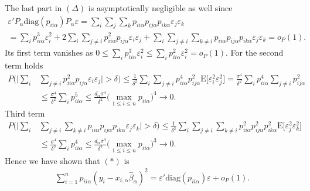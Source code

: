 \documentclass[Research_Module_ES.tex]{subfiles}
\begin{document}
The last part in $(\Delta)$ is asymptotically negligible as well since
\begin{align*}
\varepsilon'P_\alpha\mathrm{diag}(p_{ii\alpha})P_\alpha \varepsilon = \sum_i\sum_j\sum_k p_{ii\alpha}p_{ij\alpha}p_{ik\alpha}\varepsilon_j\varepsilon_k\\
=\sum_i p_{ii\alpha}^3 \varepsilon_i^2 +2\sum_i\sum_{j\neq i}p_{ii\alpha}^2p_{ij\alpha}\varepsilon_i\varepsilon_j + 
\sum_i\sum_{j\neq i}\sum_{k\neq i}p_{ii\alpha}p_{ij\alpha}p_{ik\alpha}\varepsilon_j\varepsilon_k=o_P(1).
\end{align*}
Its first term vanishes as $0\le \sum_i p_{ii\alpha}^3 \varepsilon_i^2 \le \sum_i p_{ii\alpha}^2 \varepsilon_i^2 = o_P(1)$.
For the second term holds
\begin{align*}
P\biggl(\biggl|\sum_{i}&\sum_{j\neq i}p_{ii\alpha}^2p_{ij\alpha}\varepsilon_i\varepsilon_j\biggr|>\delta\biggr)\le\frac{1}{\delta^2}\sum_{i}\sum_{j\neq i}p_{ii\alpha}^4p_{ij\alpha}^2\mathrm{E}\bigl[\varepsilon_i^2\varepsilon_j^2\bigr]
= \frac{\sigma^4}{\delta^2}\sum_{i}p_{ii\alpha}^4\sum_{j\neq i}p_{ij\alpha}^2\\
&\le \frac{\sigma^4}{\delta^2}\sum_{i}p_{ii\alpha}^5 \le \frac{d_\alpha\sigma^4}{\delta^2}\biggl(\max_{1\le i\le n}p_{ii\alpha}\biggr)^4 \to 0.
\end{align*}
Third term
\begin{align*}
P\biggl(\biggl|\sum_i&\sum_{j\neq i}\sum_{k\neq i}p_{ii\alpha}p_{ij\alpha}p_{ik\alpha}\varepsilon_j\varepsilon_k\biggr|>\delta\biggr)\le\frac{1}{\delta^2}\sum_i\sum_{j\neq i}\sum_{k\neq i}p_{ii\alpha}^2p_{ij\alpha}^2p_{ik\alpha}^2\mathrm{E}\bigl[\varepsilon_j^2\varepsilon_k^2\bigr]\\
&\le \frac{\sigma^4}{\delta^2} \sum_i p_{ii\alpha}^4 \le \frac{d_\alpha\sigma^4}{\delta^2}\biggl(\max_{1\le i\le n}p_{ii\alpha}\biggr)^3 \to 0.
\end{align*}
Hence we have shown that $(\ast)$ is 
\begin{align*}
\sum_{i=1}^n p_{ii\alpha}(y_i-x_{i,\alpha}\hat{\beta}_\alpha)^2 = \varepsilon'\mathrm{diag}(p_{ii\alpha})\varepsilon + o_P(1).
\end{align*}
\end{document}
